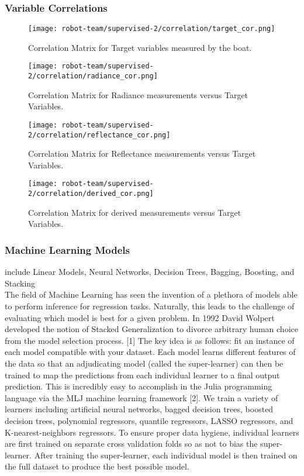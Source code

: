\subsubsection{Variable Correlations}

\begin{figure}[h]
\texttt{[image: robot-team/supervised-2/correlation/target\_cor.png]}
\caption{Correlation Matrix for Target variables measured by the boat.\label{target_cor}}
\end{figure}

\begin{figure}[h]
\texttt{[image: robot-team/supervised-2/correlation/radiance\_cor.png]}
\caption{Correlation Matrix for Radiance measurements versus Target Variables.\label{rad_cor}}
\end{figure}

\begin{figure}[h]
\texttt{[image: robot-team/supervised-2/correlation/reflectance\_cor.png]}
\caption{Correlation Matrix for Reflectance measurements versus Target Variables.\label{ref_cor}}
\end{figure}

\begin{figure}[h]
\texttt{[image: robot-team/supervised-2/correlation/derived\_cor.png]}
\caption{Correlation Matrix for derived measurements versus Target Variables.\label{derived_cor}}
\end{figure}



\subsubsection{Machine Learning Models}
include Linear Models, Neural Networks, Decision Trees, Bagging, Boosting, and Stacking\\

The field of Machine Learning has seen the invention of a plethora of models able to perform inference for regression tasks. Naturally, this leads to the challenge of evaluating which model is best for a given problem. In 1992 David Wolpert developed the notion of Stacked Generalization to divorce arbitrary human choice from the model selection process. [1] The key idea is as follows: fit an instance of each model compatible with your dataset. Each model learns different features of the data so that an adjudicating model (called the super-learner) can then be trained to map the predictions from each individual learner to a final output prediction. This is incredibly easy to accomplish in the Julia programming language via the MLJ machine learning framework [2]. We train a variety of learners including artificial neural networks, bagged decision trees, boosted decision trees, polynomial regressors, quantile regressors, LASSO regressors, and K-nearest-neighbors regressors. To ensure proper data hygiene, individual learners are first trained on separate cross validation folds so as not to bias the super-learner. After training the super-learner, each individual model is then trained on the full dataset to produce the best possible model.


